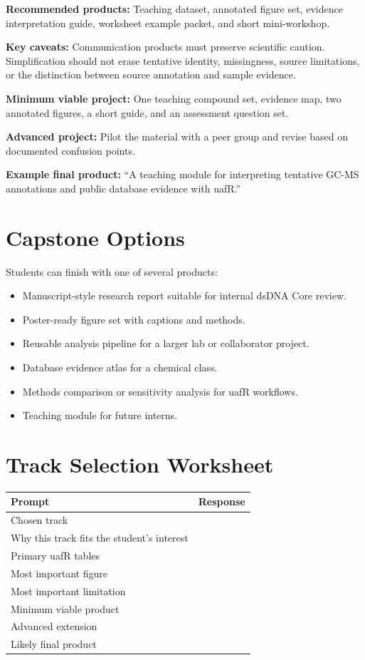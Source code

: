 \textbf{Recommended products:} Teaching dataset, annotated figure set, evidence interpretation guide, worksheet example packet, and short mini-workshop.

\textbf{Key caveats:} Communication products must preserve scientific caution. Simplification should not erase tentative identity, missingness, source limitations, or the distinction between source annotation and sample evidence.

\textbf{Minimum viable project:} One teaching compound set, evidence map, two annotated figures, a short guide, and an assessment question set.

\textbf{Advanced project:} Pilot the material with a peer group and revise based on documented confusion points.

\textbf{Example final product:} ``A teaching module for interpreting tentative GC-MS annotations and public database evidence with uafR.''

\section{Capstone Options}
Students can finish with one of several products:
\begin{itemize}
  \item Manuscript-style research report suitable for internal dsDNA Core review.
  \item Poster-ready figure set with captions and methods.
  \item Reusable analysis pipeline for a larger lab or collaborator project.
  \item Database evidence atlas for a chemical class.
  \item Methods comparison or sensitivity analysis for uafR workflows.
  \item Teaching module for future interns.
\end{itemize}

\section{Track Selection Worksheet}
\begin{tabularx}{\textwidth}{p{}Y}
\toprule
\textbf{Prompt} & \textbf{Response}\\
\midrule
Chosen track & \rule{0pt}{2.5em}\\
Why this track fits the student's interest & \rule{0pt}{3em}\\
Primary uafR tables & \rule{0pt}{3em}\\
Most important figure & \rule{0pt}{3em}\\
Most important limitation & \rule{0pt}{3em}\\
Minimum viable product & \rule{0pt}{3em}\\
Advanced extension & \rule{0pt}{3em}\\
Likely final product & \rule{0pt}{3em}\\
\bottomrule
\end{tabularx}
